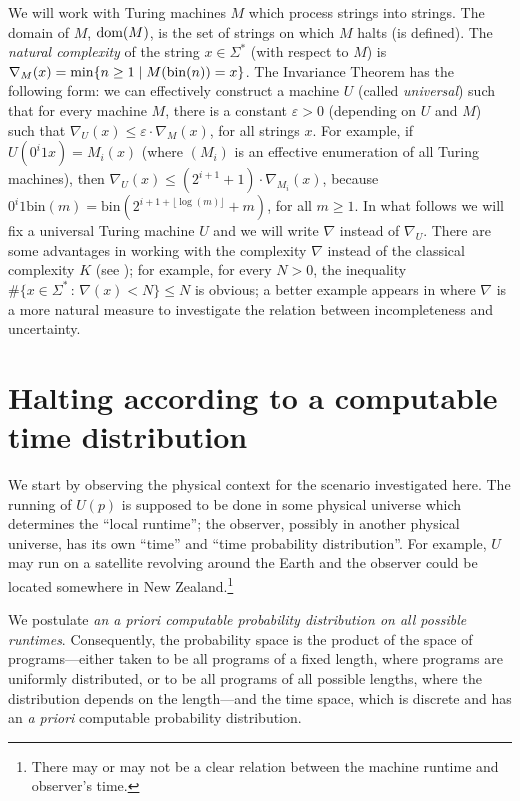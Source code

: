 \documentclass[12pt,twoside,openright]{report}
\newcommand{\dom}{\mbox{\rm dom}}
\newcommand{\bin}{\mbox{bin}}
\begin{document}
We will work with  Turing machines $M$  which process  strings into  strings. The domain of $M$, $\dom (M)$, is the set of strings on which $M$ halts (is defined).  The  {\it natural complexity} \cite{CSNatural2006} of the string $x\in\Sigma^*$ (with respect to $M$) is $\nabla_M(x) = \min\{n\ge 1 \mid M({\rm bin}(n))=x\}$.  The Invariance Theorem \cite{Calude} has the following form: we can effectively construct a machine $U$ (called {\em universal}) such that for every  machine $M$, there is a constant $\varepsilon>0$ (depending on $U$ and $M$) such that $\nabla_U (x) \leq \varepsilon \cdot \nabla_M (x)$, for all strings $x$. For example, if $U(0^{i}1x) = M_{i}(x)$ (where $(M_{i})$ is an effective enumeration of all Turing machines), then $\nabla_{U}(x) \le (2^{i+1}+1)\cdot \nabla_{M_{i}}(x)$, because $0^{i}1\bin(m) = \bin (2^{i+1 +\lfloor \log (m)\rfloor}+m)$, for all $m\ge 1$. In what follows we will fix a universal Turing machine $U$ and we will write $\nabla$ instead of $\nabla_{U}$. There are some advantages in working with the complexity $\nabla$ instead of the classical complexity $K$ (see \cite{Calude});  for example, for every $N>0$, the inequality $\#\{x\in \Sigma^{*}\,:\, \nabla (x) <N\}\le N$ is  obvious; a better example appears in \cite{cs0} where $\nabla$ is a more natural measure to investigate the relation between incompleteness and uncertainty.
 

\section{Halting according to a computable time distribution}

We start by observing the physical context for the scenario investigated here.  The running of $U(p)$ is supposed to be done in some physical universe which determines the ``local runtime''; the observer, possibly in another physical universe, has its own ``time'' and ``time probability distribution''.  For example, $U$ may run on a satellite revolving around the Earth and the observer could be located somewhere in New Zealand.\footnote{There may or may not be a clear relation between the machine runtime and observer's time. }
\fi

We postulate {\it an a priori computable probability distribution on all possible runtimes}. Consequently, the probability space is the product of the space of programs---either taken to be all programs of a fixed length, where programs are uniformly distributed, or to be all programs of all possible lengths, where the distribution depends on the length---and the time space, which is discrete and has an {\it a priori} computable probability distribution. 
\end{document}
